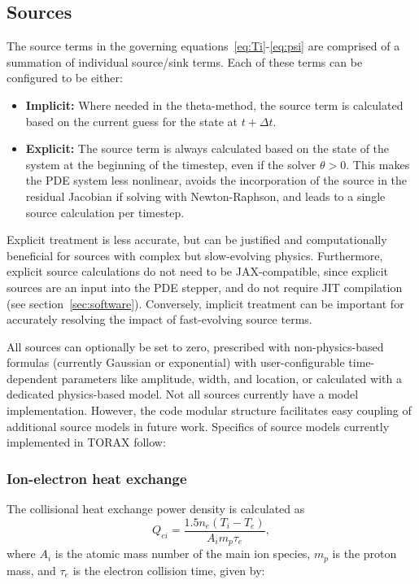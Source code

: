 \documentclass[aps, reprint, nofootinbib]{revtex4-2}
\begin{document}
\subsection{Sources}
The source terms in the governing equations~\ref{eq:Ti}-\ref{eq:psi} are comprised of a summation of individual source/sink terms. Each of these terms can be configured to be either:
\begin{itemize}
\item \textbf{Implicit:} Where needed in the theta-method, the source term is calculated based on the current guess for the state at $t+\Delta t$.
\item \textbf{Explicit:}  The source term is always calculated based on the state of the system at the beginning of the timestep, even if the solver $\theta>0$. This makes the PDE system less nonlinear, avoids the incorporation of the source in the residual Jacobian if solving with Newton-Raphson, and leads to a single source calculation per timestep.
\end{itemize}
Explicit treatment is less accurate, but can be justified and computationally beneficial for sources with complex but slow-evolving physics. Furthermore, explicit source calculations do not need to be JAX-compatible, since explicit sources are an input into the PDE stepper, and do not require JIT compilation (see section~\ref{sec:software}). Conversely, implicit treatment can be important for accurately resolving the impact of fast-evolving source terms. 

All sources can optionally be set to zero, prescribed with non-physics-based formulas (currently Gaussian or exponential) with user-configurable time-dependent parameters like amplitude, width, and location, or calculated with a dedicated physics-based model. Not all sources currently have a model implementation. However, the code modular structure facilitates easy coupling of additional source models in future work. Specifics of source models currently implemented in TORAX follow:

\subsubsection{Ion-electron heat exchange}
The collisional heat exchange power density is calculated as
\begin{equation}
Q_{ei} = \frac{1.5 n_e (T_i - T_e)}{A_i m_p \tau_e},    
\end{equation}
where $A_i$ is the atomic mass number of the main ion species, $m_p$ is the proton mass, and $\tau_e$ is the electron collision time, given by:
\end{document}
